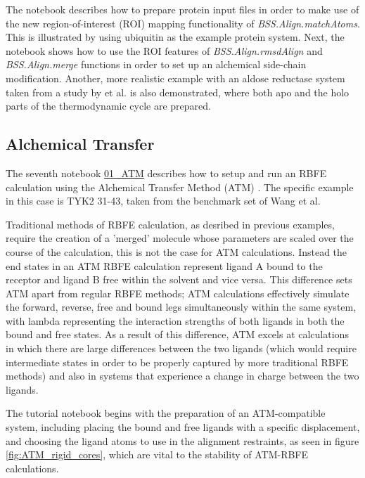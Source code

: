The notebook describes how to prepare protein input files in order to make use of the new region-of-interest (ROI) mapping functionality of \textit{BSS.Align.matchAtoms}. This is illustrated by using ubiquitin as the example protein system. Next, the notebook shows how to use the ROI features of \textit{BSS.Align.rmsdAlign} and \textit{BSS.Align.merge} functions in order to set up an alchemical side-chain modification. Another, more realistic example with an aldose reductase system taken from a study by \citeauthor{doi:10.1021/acscentsci.8b00717} et al. is also demonstrated, where both apo and the holo parts of the thermodynamic cycle are prepared.

\subsection{Alchemical Transfer}

The seventh notebook \href{https://github.com/OpenBioSim/biosimspace_tutorials/blob/main/04_fep/05_ATM/01_ATM.ipynb}{01_ATM} describes how to setup and run an RBFE calculation using the Alchemical Transfer Method (ATM) \cite{WU2021}. The specific example in this case is TYK2 31-43, taken from the benchmark set of Wang et al. \cite{Wang2015} 

Traditional methods of RBFE calculation, as desribed in previous examples, require the creation of a 'merged' molecule whose parameters are scaled over the course of the calculation, this is not the case for ATM calculations. Instead the end states in an ATM RBFE calculation represent ligand A bound to the receptor and ligand B free within the solvent and vice versa. This difference sets ATM apart from regular RBFE methods; ATM calculations effectively simulate the forward, reverse, free and bound legs simultaneously within the same system, with lambda representing the interaction strengths of both ligands in both the bound and free states. As a result of this difference, ATM excels at calculations in which there are large differences between the two ligands (which would require intermediate states in order to be properly captured by more traditional RBFE methods) and also in systems that experience a change in charge between the two ligands.

The tutorial notebook begins with the preparation of an ATM-compatible system, including placing the bound and free ligands with a specific displacement, and choosing the ligand atoms to use in the alignment restraints, as seen in figure \ref{fig:ATM_rigid_cores}, which are vital to the stability of ATM-RBFE calculations.

